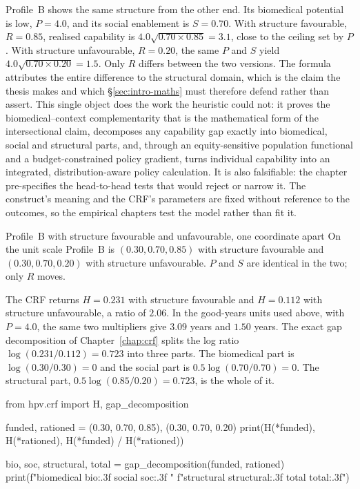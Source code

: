 Profile~B shows the same structure from the other end. Its biomedical
potential is low, $P=4.0$, and its social enablement is $S=0.70$. With
structure favourable, $R=0.85$, realised capability is
$4.0\sqrt{0.70\times0.85}=3.1$, close to the ceiling set by $P$. With
structure unfavourable, $R=0.20$, the same $P$ and $S$ yield
$4.0\sqrt{0.70\times0.20}=1.5$. Only $R$ differs between the two versions.
The formula attributes the entire difference to the structural domain, which is
the claim the thesis makes and which \S\ref{sec:intro-maths} must therefore
defend rather than assert. This single object does the work the heuristic could not: it proves the biomedical--context complementarity that is the mathematical form of the intersectional \citep{crenshaw_1991,bowleg_2008} claim, decomposes any capability gap exactly into biomedical, social and structural parts, and, through an equity-sensitive population functional and a budget-constrained policy gradient, turns individual capability into an integrated, distribution-aware policy calculation. It is also falsifiable: the chapter pre-specifies the head-to-head tests that would reject or narrow it. The construct's meaning and the CRF's parameters are fixed without reference to the outcomes, so the empirical chapters test the model rather than fit it.

\begin{workedexample}{Profile~B with structure favourable and unfavourable, one coordinate apart}
On the unit scale Profile~B is $(0.30,0.70,0.85)$ with structure favourable and
$(0.30,0.70,0.20)$ with structure unfavourable. $P$ and $S$ are identical in
the two; only $R$ moves.

The CRF returns $H=0.231$ with structure favourable and $H=0.112$ with
structure unfavourable, a ratio of $2.06$. In
the good-years units used above, with $P=4.0$, the same two multipliers give
$3.09$ years and $1.50$ years. The exact gap decomposition of
Chapter~\ref{chap:crf} splits the log ratio
$\log(0.231/0.112)=0.723$ into three parts. The biomedical part is
$\log(0.30/0.30)=0$ and the social part is $0.5\log(0.70/0.70)=0$. The
structural part, $0.5\log(0.85/0.20)=0.723$, is the whole of it.

\begin{wecode}[Python]
from hpv.crf import H, gap_decomposition

funded, rationed = (0.30, 0.70, 0.85), (0.30, 0.70, 0.20)
print(H(*funded), H(*rationed), H(*funded) / H(*rationed))

bio, soc, structural, total = gap_decomposition(funded, rationed)
print(f"biomedical {bio:.3f}  social {soc:.3f}  "
      f"structural {structural:.3f}  total {total:.3f}")
\end{wecode}

\end{workedexample}


